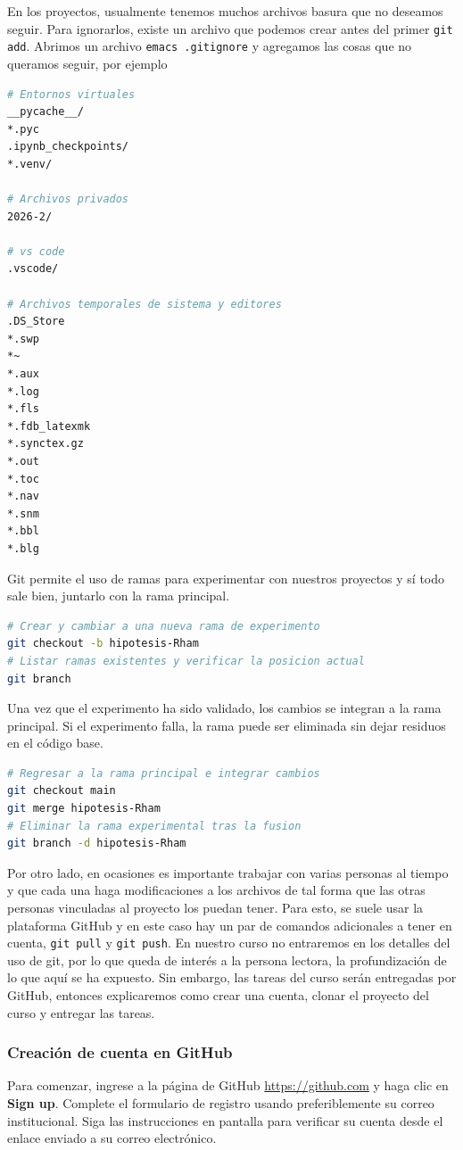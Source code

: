 \documentclass[12pt]{article}
\begin{document}
En los proyectos, usualmente tenemos muchos archivos basura que no deseamos 
seguir. Para ignorarlos, existe un archivo que podemos crear antes del primer 
\lstinline|git add|. Abrimos un archivo  \lstinline|emacs .gitignore| y agregamos 
las cosas que no queramos seguir, por ejemplo
\begin{lstlisting}[language=bash]
# Entornos virtuales 
__pycache__/
*.pyc
.ipynb_checkpoints/
*.venv/

# Archivos privados
2026-2/

# vs code
.vscode/

# Archivos temporales de sistema y editores
.DS_Store
*.swp
*~
*.aux
*.log
*.fls
*.fdb_latexmk
*.synctex.gz
*.out
*.toc
*.nav
*.snm
*.bbl
*.blg
\end{lstlisting}

Git permite el uso de ramas para experimentar con nuestros proyectos y sí 
todo sale bien, juntarlo con la rama principal. 
\begin{lstlisting}[language=bash]
# Crear y cambiar a una nueva rama de experimento
git checkout -b hipotesis-Rham		
# Listar ramas existentes y verificar la posicion actual
git branch
\end{lstlisting}
Una vez que el experimento ha sido validado, los cambios se 
integran a la rama principal. 
Si el experimento falla, la rama puede ser eliminada sin 
dejar residuos en el código base.
\begin{lstlisting}[language=bash]
# Regresar a la rama principal e integrar cambios
git checkout main
git merge hipotesis-Rham	
# Eliminar la rama experimental tras la fusion
git branch -d hipotesis-Rham	
\end{lstlisting}

Por otro lado, en ocasiones es importante trabajar con varias personas
al tiempo y que cada una haga modificaciones a los archivos de tal forma que 
las otras personas vinculadas al proyecto los puedan tener.
Para esto, se suele usar la plataforma GitHub y en este caso hay un par de comandos
adicionales a tener en cuenta, \lstinline|git pull| y \lstinline|git push|.
En nuestro curso no entraremos en los detalles del uso de git, por lo que 
queda de interés a la persona lectora, la profundización de lo que aquí se 
ha expuesto. Sin embargo, las tareas del curso serán entregadas por GitHub, 
entonces explicaremos como crear una cuenta, clonar el proyecto del curso y 
entregar las tareas.

\subsubsection*{Creación de cuenta en GitHub}
Para comenzar, ingrese a la página de GitHub \href{https://github.com}{https://github.com} 
y haga clic en \textbf{Sign up}. Complete el formulario de registro 
usando preferiblemente su correo institucional. 
Siga las instrucciones en pantalla para verificar su cuenta desde 
el enlace enviado a su correo electrónico.
\end{document}
